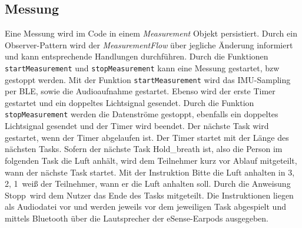 \subsection{Messung}
\label{ch:Implementierung:app:measurement}
Eine Messung wird im Code in einem \textit{Measurement} Objekt persistiert.
Durch ein Observer-Pattern wird der \textit{MeasurementFlow} über jegliche Änderung informiert und kann entsprechende Handlungen durchführen.
Durch die Funktionen \texttt{startMeasurement} und \texttt{stopMeasurement} kann eine Messung gestartet, bzw gestoppt werden.
Mit der Funktion \texttt{startMeasurement} wird das IMU-Sampling per BLE, sowie die Audioaufnahme gestartet. 
Ebenso wird der erste Timer gestartet und ein doppeltes Lichtsignal gesendet. 
Durch die Funktion \texttt{stopMeasurement} werden die Datenströme gestoppt, ebenfalls ein doppeltes Lichtsignal gesendet und der Timer wird beendet.
Der nächste Task wird gestartet, wenn der Timer abgelaufen ist. Der Timer startet mit der Länge des nächsten Tasks.
Sofern der nächste Task {\glqq Hold\_breath\grqq} ist, also die Person im folgenden Task die Luft anhält, wird dem Teilnehmer kurz vor Ablauf mitgeteilt, wann der nächste Task startet.
Mit der Instruktion \glqq Bitte die Luft anhalten in 3, 2, 1\grqq \ weiß der Teilnehmer, wann er die Luft anhalten soll.
Durch die Anweisung \glqq Stopp\grqq \ wird dem Nutzer das Ende des Tasks mitgeteilt. 
Die Instruktionen liegen als Audiodatei vor und werden jeweils vor dem jeweiligen Task abgespielt und mittels Bluetooth über die Lautsprecher der eSense-Earpods ausgegeben.

